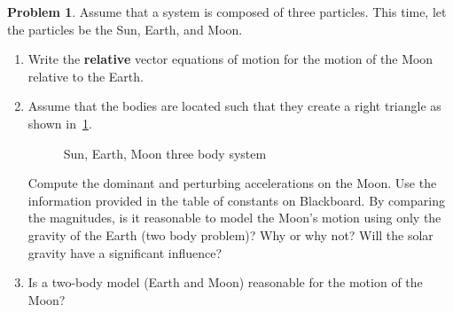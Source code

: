 \documentclass[10pt]{article}
\theoremstyle{definition}
\newtheorem{prob}{Problem}[section]
\newenvironment{subprob}%
{\renewcommand{\theenumi}{\alph{enumi}}\renewcommand{\labelenumi}{(\theenumi)}\begin{enumerate}}%
{\end{enumerate}}%
\begin{document}
\begin{prob}
    Assume that a system is composed of three particles.
    This time, let the particles be the Sun, Earth, and Moon.

    \begin{subprob}
        \item Write the \textbf{relative} vector equations of motion for the motion of the Moon relative to the Earth.
        \item Assume that the bodies are located such that they create a right triangle as shown in~\cref{fig:sem_3bp}.

            \begin{figure}[htbp]
                \centering
                \caption{Sun, Earth, Moon three body system~\label{fig:sem_3bp}}
            \end{figure}

            Compute the dominant and perturbing accelerations on the Moon.
            Use the information provided in the table of constants on Blackboard. 
            By comparing the magnitudes, is it reasonable to model the Moon's motion using only the gravity of the Earth (two body problem)?
            Why or why not?
            Will the solar gravity have a significant influence?

        \item Is a two-body model (Earth and Moon) reasonable for the motion of the Moon?
    \end{subprob}
\end{prob}
\end{document}
